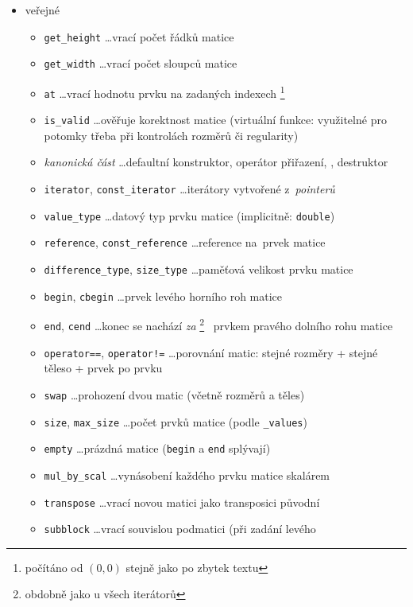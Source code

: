 \documentclass[11pt,a4paper]{article}
\begin{document}
\begin{itemize}
  \item veřejné
  \begin{itemize}
    \item \verb=get_height= \ldots vrací počet řádků matice
    \item \verb=get_width= \ldots vrací počet sloupců matice
    \item \verb=at= \ldots vrací hodnotu prvku na zadaných
      indexech\thinspace%
      \footnote{počítáno od $(0,0)$ stejně jako po zbytek textu}
    \item \verb=is_valid= \ldots ověřuje korektnost matice (virtuální funkce:
      vy\-u\-ži\-tel\-né pro potomky třeba při kontrolách rozměrů či
      regularity)
    \item \emph{kanonická část\/} \ldots defaultní konstruktor, operátor
      přiřazení, , destruktor
    \item \verb=iterator=, \verb=const_iterator= \ldots iterátory vytvořené
      z~\emph{pointerů\/}
    \item \verb=value_type= \ldots datový typ prvku matice (implicitně:
      \verb=double=)
    \item \verb=reference=, \verb=const_reference= \ldots reference na~prvek
      matice
    \item \verb=difference_type=, \verb=size_type= \ldots paměťová velikost
      prvku matice
    \item \verb=begin=, \verb=cbegin= \ldots prvek levého horního roh matice
    \item \verb=end=, \verb=cend= \ldots konec se nachází
      \emph{za\/}\thinspace%
      \footnote{obdobně jako u všech iterátorů}
      ~prvkem pravého dolního rohu matice
    \item \verb~operator==~, \verb~operator!=~ \ldots porovnání matic: stejné
      rozměry + stejné těleso + prvek po prvku
    \item \verb~swap~ \ldots prohození dvou matic (včetně rozměrů a těles)
    \item \verb~size~, \verb~max_size~ \ldots počet prvků matice (podle
      \verb~_values~)
    \item \verb~empty~ \ldots prázdná matice (\verb=begin= a \verb=end=
      splývají)
    \item \verb~mul_by_scal~ \ldots vynásobení každého prvku matice skalárem
    \item \verb~transpose~ \ldots vrací novou matici jako transposici původní
    \item \verb~subblock~ \ldots vrací souvislou podmatici (při zadání levého

\end{itemize}
\end{itemize}
\end{document}
